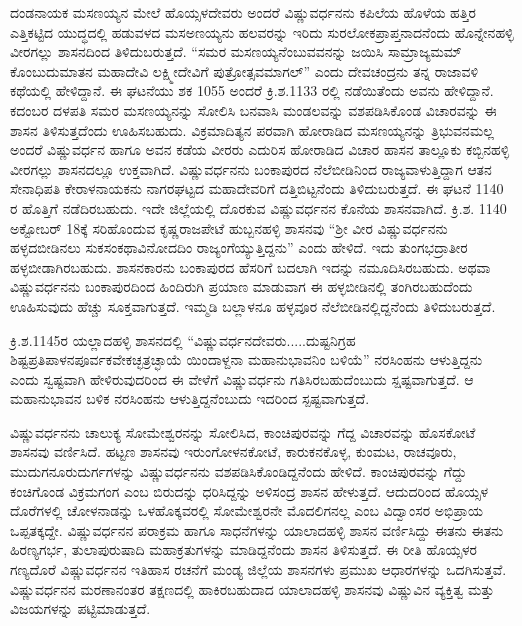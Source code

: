 \vskip 3pt

ದಂಡನಾಯಕ ಮಸಣಯ್ಯನ ಮೇಲೆ ಹೊಯ್ಸಳದೇವರು ಅಂದರೆ ವಿಷ್ಣುವರ್ಧನನು ಕಪಿಲೆಯ ಹೊಳೆಯ ಹತ್ತಿರ ಎತ್ತಿಕಟ್ಟಿದ ಯುದ್ಧದಲ್ಲಿ ಹಡುವಳದ ಮಸಅಣಯ್ಯನು ಹಲವರನ್ನು ಇರಿದು ಸುರಲೋಕಪ್ರಾಪ್ತನಾದನೆಂದು ಹೊನ್ನೇನಹಳ್ಳಿ ವೀರಗಲ್ಲು ಶಾಸನದಿಂದ ತಿಳಿದುಬರುತ್ತದೆ. “ಸಮರ ಮಸಣಯ್ಯನೆಂಬುವವನನ್ನು ಜಯಿಸಿ ಸಾಮ್ರಾಜ್ಯಮಮ್ ಕೊಂಬುದುಮಾತನ ಮಹಾದೇವಿ ಲಕ್ಷ್ಮೀದೇವಿಗೆ ಪುತ್ರೋತ್ಸವಮಾಗಲ್​” ಎಂದು ದೇವಚಂದ್ರನು ತನ್ನ ರಾಜಾವಳಿ ಕಥೆಯಲ್ಲಿ ಹೇಳಿದ್ದಾನೆ. ಈ ಘಟನೆಯು ಶಕ 1055 ಅಂದರೆ ಕ್ರಿ.ಶ.1133 ರಲ್ಲಿ ನಡೆಯಿತೆಂದು ಅವನು ಹೇಳಿದ್ದಾನೆ. ಕದಂಬರ ದಳಪತಿ ಸಮರ ಮಸಣಯ್ಯನನ್ನು ಸೋಲಿಸಿ ಬನವಾಸಿ ಮಂಡಲವನ್ನು ವಶಪಡಿಸಿಕೊಂಡ ವಿಚಾರವನ್ನು ಈ ಶಾಸನ ತಿಳಿಸುತ್ತದೆಂದು ಊಹಿಸಬಹುದು. ವಿಕ್ರಮಾದಿತ್ಯನ ಪರವಾಗಿ ಹೋರಾಡಿದ ಮಸಣಯ್ಯನನ್ನು ತ್ರಿಭುವನಮಲ್ಲ ಅಂದರೆ ವಿಷ್ಣುವರ್ಧನ ಹಾಗೂ ಅವನ ಕಡೆಯ ವೀರರು ಎದುರಿಸ ಹೋರಾಡಿದ ವಿಚಾರ ಹಾಸನ ತಾಲ್ಲೂಕು ಕಬ್ಬಿನಹಳ್ಳಿ ವೀರಗಲ್ಲು ಶಾಸನದಲ್ಲೂ ಉಕ್ತವಾಗಿದೆ. ವಿಷ್ಣುವರ್ಧನನು ಬಂಕಾಪುರದ ನೆಲೆಬೀಡಿನಿಂದ ರಾಜ್ಯವಾಳುತ್ತಿದ್ದಾಗ ಆತನ ಸೇನಾಧಿಪತಿ ಕೇರಾಳನಾಯಕನು ನಾಗರಘಟ್ಟದ ಮಹಾದೇವರಿಗೆ ದತ್ತಿಬಿಟ್ಟನೆಂದು ತಿಳಿದುಬರುತ್ತದೆ. ಈ ಘಟನೆ 1140 ರ ಹೊತ್ತಿಗೆ ನಡೆದಿರಬಹುದು. ಇದೇ ಜಿಲ್ಲೆಯಲ್ಲಿ ದೊರಕುವ ವಿಷ್ಣುವರ್ಧನನ ಕೊನೆಯ ಶಾಸನವಾಗಿದೆ. ಕ್ರಿ.ಶ. 1140 ಅಕ್ಟೋಬರ್​ 18ಕ್ಕೆ ಸರಿಹೊಂದುವ ಕೃಷ್ಣರಾಜಪೇಟೆ ಹುಬ್ಬನಹಳ್ಳಿ ಶಾಸನವು “ಶ‍್ರೀ ವೀರ ವಿಷ್ಣುವರ್ಧನನು ಹಳ್ಳದಬೀಡಿನಲು ಸುಕಸಂಕಥಾವಿನೋದದಿಂ ರಾಜ್ಯಂಗೆಯ್ಯುತ್ತಿದ್ದನು” ಎಂದು ಹೇಳಿದೆ. ಇದು ತುಂಗಭದ್ರಾತೀರ ಹಳ್ಳಬೀಡಾಗಿರಬಹುದು. ಶಾಸನಕಾರನು ಬಂಕಾಪುರದ ಹೆಸರಿಗೆ ಬದಲಾಗಿ ಇದನ್ನು ನಮೂದಿಸಿರಬಹುದು. ಅಥವಾ ವಿಷ್ಣುವರ್ಧನನು ಬಂಕಾಪುರದಿಂದ ಹಿಂದಿರುಗಿ ಪ್ರಯಾಣ ಮಾಡುವಾಗ ಈ ಹಳ್ಳಬೀಡಿನಲ್ಲಿ ತಂಗಿರಬಹುದೆಂದು ಊಹಿಸುವುದು ಹೆಚ್ಚು ಸೂಕ್ತವಾಗುತ್ತದೆ. ಇಮ್ಮಡಿ ಬಲ್ಲಾಳನೂ ಹಳ್ಳವೂರ ನೆಲೆಬೀಡಿನಲ್ಲಿದ್ದನೆಂದು ತಿಳಿದುಬರುತ್ತದೆ.

ಕ್ರಿ.ಶ.1145ರ ಯಲ್ಲಾದಹಳ್ಳಿ ಶಾಸನದಲ್ಲಿ “ವಿಷ್ಣುವರ್ಧನದೇವರು.....ದುಷ್ಟನಿಗ್ರಹ ಶಿಷ್ಟಪ್ರತಿಪಾಳನ\break ಪೂರ್ವಕವೇಕಚ್ಛತ್ರಚ್ಛಾಯೆ ಯಿಂದಾಳ್ದನಾ ಮಹಾನುಭಾವನಿಂ ಬಳಿಯೆ” ನರಸಿಂಹನು ಆಳುತ್ತಿದ್ದನು ಎಂದು ಸ್ವಷ್ಟವಾಗಿ ಹೇಳಿರುವುದರಿಂದ ಈ ವೇಳೆಗೆ ವಿಷ್ಣುವರ್ಧನು ಗತಿಸಿರಬಹುದೆಂಬುದು ಸ್ಷಷ್ಟವಾಗುತ್ತದೆ. ಆ ಮಹಾನುಭಾವನ ಬಳಿಕ ನರಸಿಂಹನು ಆಳುತ್ತಿದ್ದನೆಂಬುದು ಇದರಿಂದ ಸ್ಪಷ್ಟವಾಗುತ್ತದೆ. 

ವಿಷ್ಣುವರ್ಧನನು ಚಾಲುಕ್ಯ ಸೋಮೇಶ್ವರನನ್ನು ಸೋಲಿಸಿದ, ಕಾಂಚಿಪುರವನ್ನು ಗೆದ್ದ ವಿಚಾರವನ್ನು ಹೊಸಕೋಟೆ ಶಾಸನವು ವರ್ಣಿಸಿದೆ. ಹಟ್ಟಣ ಶಾಸನವು ಇರುಂಗೋಳನಕೋಟೆ, ಕಾರುಕನಕೊಳ್ಳ, ಕುಂಮಟ, ರಾಚವೂರು, ಮುದುಗನೂರುದುರ್ಗ\-ಗಳನ್ನು ವಿಷ್ಣುವರ್ಧನನು ವಶಪಡಿಸಿಕೊಂಡಿದ್ದನೆಂದು ಹೇಳಿದೆ. ಕಾಂಚಿಪುರವನ್ನು ಗೆದ್ದು ಕಂಚಿಗೊಂಡ ವಿಕ್ರಮಗಂಗ ಎಂಬ ಬಿರುದನ್ನು ಧರಿಸಿದ್ದನ್ನು ಅಳಿಸಂದ್ರ ಶಾಸನ ಹೇಳುತ್ತದೆ. ಆದುದರಿಂದ ಹೊಯ್ಸಳ ದೊರೆಗಳಲ್ಲಿ ಚೋಳನಾಡನ್ನು ಒಳಹೊಕ್ಕವರಲ್ಲಿ ಸೋಮೇಶ್ವರನೇ ಮೊದಲಿಗನಲ್ಲ ಎಂಬ ವಿದ್ವಾಂಸರ ಅಭಿಪ್ರಾಯ ಒಪ್ಪತಕ್ಕದ್ದೇ. ವಿಷ್ಣುವರ್ಧನನ ಪರಾಕ್ರಮ ಹಾಗೂ ಸಾಧನೆಗಳನ್ನು ಯಾಲಾದಹಳ್ಳಿ ಶಾಸನ ವರ್ಣಿಸಿದ್ದು ಈತನು ಈತನು ಹಿರಣ್ಯಗರ್ಭ, ತುಲಾಪುರುಷಾದಿ ಮಹಾಕ್ರತುಗಳನ್ನು ಮಾಡಿದ್ದನೆಂದು ಶಾಸನ ತಿಳಿಸುತ್ತದೆ. ಈ ರೀತಿ ಹೊಯ್ಸಳರ ಗಣ್ಯದೊರೆ ವಿಷ್ಣುವರ್ಧನನ ಇತಿಹಾಸ ರಚನೆಗೆ ಮಂಡ್ಯ ಜಿಲ್ಲೆಯ ಶಾಸನಗಳು ಪ್ರಮುಖ ಆಧಾರಗಳನ್ನು ಒದಗಿಸುತ್ತವೆ. ವಿಷ್ಣುವರ್ಧನನ ಮರಣಾನಂತರ ತಕ್ಷಣದಲ್ಲಿ ಹಾಕಿರಬಹುದಾದ ಯಾಲಾದಹಳ್ಳಿ ಶಾಸನವು ವಿಷ್ಣುವಿನ ವ್ಯಕ್ತಿತ್ವ ಮತ್ತು ವಿಜಯಗಳನ್ನು ಪಟ್ಟಿಮಾಡುತ್ತದೆ.



